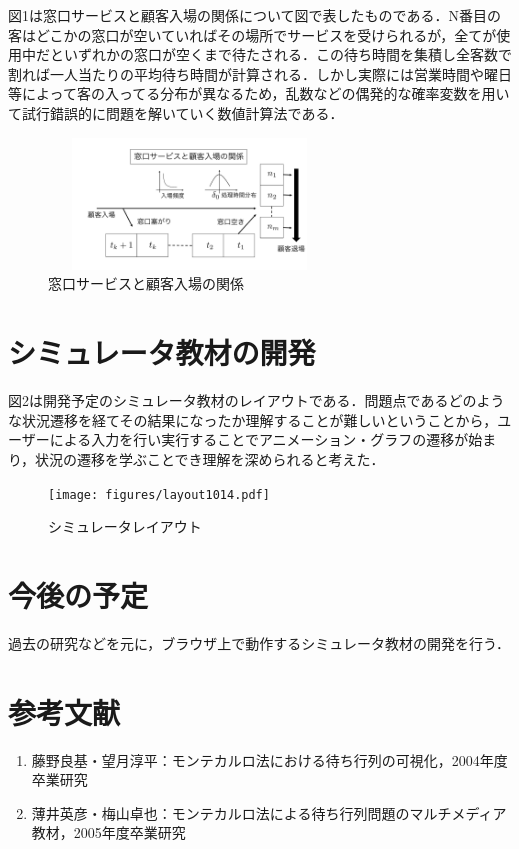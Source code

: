 \documentclass[twocolumn,10pt,a4j]{ltjsarticle}
\begin{document}
図1は窓口サービスと顧客入場の関係について図で表したものである．N番目の客はどこかの窓口が空いていればその場所でサービスを受けられるが，全てが使用中だといずれかの窓口が空くまで待たされる．この待ち時間を集積し全客数で割れば一人当たりの平均待ち時間が計算される．しかし実際には営業時間や曜日等によって客の入ってる分布が異なるため，乱数などの偶発的な確率変数を用いて試行錯誤的に問題を解いていく数値計算法である．

\begin{figure}[h]
\begin{center}
\includegraphics[clip,width=75mm,height=35mm]{figures/layout2.pdf}
\end{center}
\caption{窓口サービスと顧客入場の関係}
\label{fig:教科書}
\end{figure}

\section{シミュレータ教材の開発}
図2は開発予定のシミュレータ教材のレイアウトである．問題点であるどのような状況遷移を経てその結果になったか理解することが難しいということから，ユーザーによる入力を行い実行することでアニメーション・グラフの遷移が始まり，状況の遷移を学ぶことでき理解を深められると考えた．

\begin{figure}[h]
\begin{center}
\texttt{[image: figures/layout1014.pdf]}
\end{center}
\caption{シミュレータレイアウト}
\label{fig:教科書}
\end{figure}

\section{今後の予定}
過去の研究などを元に，ブラウザ上で動作するシミュレータ教材の開発を行う．

\section{参考文献}
\begin{enumerate}
\item 藤野良基・望月淳平：モンテカルロ法における待ち行列の可視化，2004年度卒業研究
\item 薄井英彦・梅山卓也：モンテカルロ法による待ち行列問題のマルチメディア教材，2005年度卒業研究
\end{enumerate}
\end{document}
